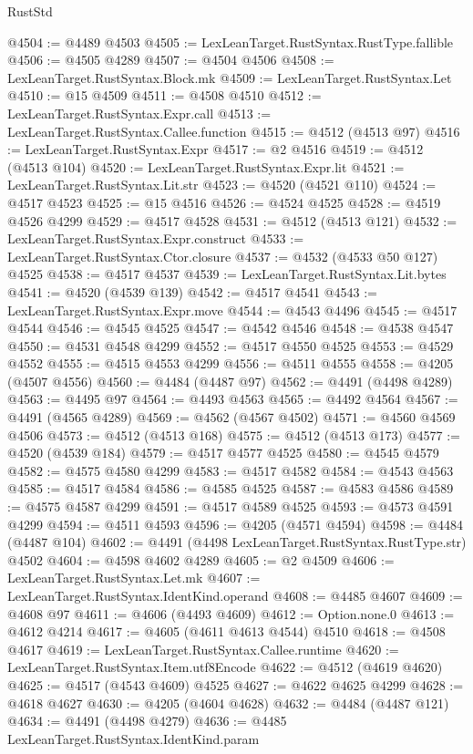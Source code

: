 \begin{lexlean}{RustStd}
\begin{coremodule}
@4504 := @4489 @4503
@4505 := LexLeanTarget.RustSyntax.RustType.fallible
@4506 := @4505 @4289
@4507 := @4504 @4506
@4508 := LexLeanTarget.RustSyntax.Block.mk
@4509 := LexLeanTarget.RustSyntax.Let
@4510 := @15 @4509
@4511 := @4508 @4510
@4512 := LexLeanTarget.RustSyntax.Expr.call
@4513 := LexLeanTarget.RustSyntax.Callee.function
@4515 := @4512 (@4513 @97)
@4516 := LexLeanTarget.RustSyntax.Expr
@4517 := @2 @4516
@4519 := @4512 (@4513 @104)
@4520 := LexLeanTarget.RustSyntax.Expr.lit
@4521 := LexLeanTarget.RustSyntax.Lit.str
@4523 := @4520 (@4521 @110)
@4524 := @4517 @4523
@4525 := @15 @4516
@4526 := @4524 @4525
@4528 := @4519 @4526 @4299
@4529 := @4517 @4528
@4531 := @4512 (@4513 @121)
@4532 := LexLeanTarget.RustSyntax.Expr.construct
@4533 := LexLeanTarget.RustSyntax.Ctor.closure
@4537 := @4532 (@4533 @50 @127) @4525
@4538 := @4517 @4537
@4539 := LexLeanTarget.RustSyntax.Lit.bytes
@4541 := @4520 (@4539 @139)
@4542 := @4517 @4541
@4543 := LexLeanTarget.RustSyntax.Expr.move
@4544 := @4543 @4496
@4545 := @4517 @4544
@4546 := @4545 @4525
@4547 := @4542 @4546
@4548 := @4538 @4547
@4550 := @4531 @4548 @4299
@4552 := @4517 @4550 @4525
@4553 := @4529 @4552
@4555 := @4515 @4553 @4299
@4556 := @4511 @4555
@4558 := @4205 (@4507 @4556)
@4560 := @4484 (@4487 @97)
@4562 := @4491 (@4498 @4289)
@4563 := @4495 @97
@4564 := @4493 @4563
@4565 := @4492 @4564
@4567 := @4491 (@4565 @4289)
@4569 := @4562 (@4567 @4502)
@4571 := @4560 @4569 @4506
@4573 := @4512 (@4513 @168)
@4575 := @4512 (@4513 @173)
@4577 := @4520 (@4539 @184)
@4579 := @4517 @4577 @4525
@4580 := @4545 @4579
@4582 := @4575 @4580 @4299
@4583 := @4517 @4582
@4584 := @4543 @4563
@4585 := @4517 @4584
@4586 := @4585 @4525
@4587 := @4583 @4586
@4589 := @4575 @4587 @4299
@4591 := @4517 @4589 @4525
@4593 := @4573 @4591 @4299
@4594 := @4511 @4593
@4596 := @4205 (@4571 @4594)
@4598 := @4484 (@4487 @104)
@4602 := @4491 (@4498 LexLeanTarget.RustSyntax.RustType.str) @4502
@4604 := @4598 @4602 @4289
@4605 := @2 @4509
@4606 := LexLeanTarget.RustSyntax.Let.mk
@4607 := LexLeanTarget.RustSyntax.IdentKind.operand
@4608 := @4485 @4607
@4609 := @4608 @97
@4611 := @4606 (@4493 @4609)
@4612 := Option.none.{0}
@4613 := @4612 @4214
@4617 := @4605 (@4611 @4613 @4544) @4510
@4618 := @4508 @4617
@4619 := LexLeanTarget.RustSyntax.Callee.runtime
@4620 := LexLeanTarget.RustSyntax.Item.utf8Encode
@4622 := @4512 (@4619 @4620)
@4625 := @4517 (@4543 @4609) @4525
@4627 := @4622 @4625 @4299
@4628 := @4618 @4627
@4630 := @4205 (@4604 @4628)
@4632 := @4484 (@4487 @121)
@4634 := @4491 (@4498 @4279)
@4636 := @4485 LexLeanTarget.RustSyntax.IdentKind.param

\end{coremodule}
\end{lexlean}
